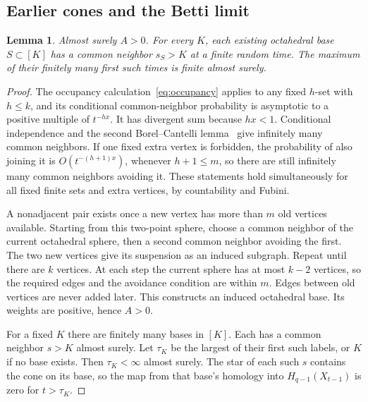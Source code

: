 \documentclass[11pt]{article}
\newtheorem{lemma}[theorem]{Lemma}
\theoremstyle{remark}\newtheorem{remark}[theorem]{Remark}
\begin{document}
\subsection{Earlier cones and the Betti limit}
\begin{lemma}\label{lem:cones}
Almost surely $A>0$. For every $K$, each existing octahedral base
$S\subset[K]$ has a common neighbor $s_S>K$ at a finite random time.
The maximum of their finitely many first such times is finite almost surely.
\end{lemma}
\begin{proof}
The occupancy calculation~\eqref{eq:occupancy} applies to any fixed
$h$-set with $h\le k$, and its conditional common-neighbor probability
is asymptotic to a positive multiple of $t^{-hx}$.
It has divergent sum because $hx<1$. Conditional independence and the
second Borel--Cantelli lemma~\cite[Theorem~2.3.7]{durrett} give infinitely
many common neighbors. If one fixed extra vertex is forbidden, the
probability of also joining it is $O(t^{-(h+1)x})$, whenever $h+1\le m$,
so there are still infinitely many common neighbors avoiding it.
These statements hold simultaneously for all fixed finite sets and extra
vertices, by countability and Fubini.

A nonadjacent pair exists once a new vertex has more than $m$ old vertices
available. Starting from this two-point sphere, choose a common neighbor
of the current octahedral sphere, then a second common neighbor avoiding
the first. The two new vertices give its suspension as an induced
subgraph. Repeat until there are $k$ vertices. At each step the current
sphere has at most $k-2$ vertices, so the required edges and the avoidance
condition are within $m$. Edges between old vertices are never added later.
This constructs an induced octahedral base. Its weights are positive,
hence $A>0$.

For a fixed $K$ there are finitely many bases in $[K]$. Each has a common
neighbor $s>K$ almost surely. Let $\tau_K$ be the largest of their first
such labels, or $K$ if no base exists. Then $\tau_K<\infty$ almost surely.
The star of each such $s$ contains the cone on its base, so the map from
that base's homology into $H_{q-1}(X_{t-1})$ is zero for $t>\tau_K$.
\end{proof}
\end{document}
